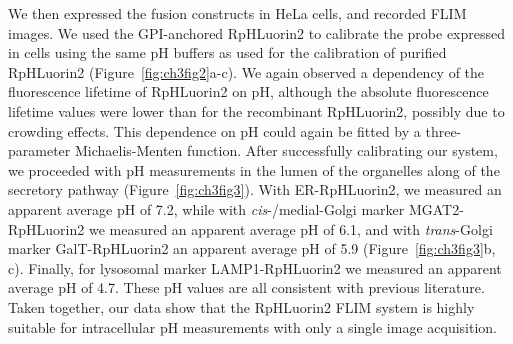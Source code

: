 We then expressed the fusion constructs in HeLa cells, and recorded FLIM images. We used the GPI-anchored RpHLuorin2 to calibrate the probe expressed in cells using the same pH buffers as used for the calibration of purified RpHLuorin2 (Figure~\ref{fig:ch3fig2}a-c). We again observed a dependency of the fluorescence lifetime of RpHLuorin2 on pH, although the absolute fluorescence lifetime values were lower than for the recombinant RpHLuorin2, possibly due to crowding effects. This dependence on pH could again be fitted by a three-parameter Michaelis-Menten function. After successfully calibrating our system, we proceeded with pH measurements in the lumen of the organelles along of the secretory pathway (Figure~\ref{fig:ch3fig3}). With ER-RpHLuorin2, we measured an apparent average pH of 7.2, while with \emph{cis}-/medial-Golgi marker MGAT2-RpHLuorin2 we measured an apparent average pH of 6.1, and with \emph{trans}-Golgi marker GalT-RpHLuorin2 an apparent average pH of 5.9 (Figure~\ref{fig:ch3fig3}b, c). Finally, for lysosomal marker LAMP1-RpHLuorin2 we measured an apparent average pH of 4.7. These pH values are all consistent with previous literature\cite{casey_sensors_2010,johnson_position_2016}. Taken together, our data show that the RpHLuorin2 FLIM system is highly suitable for intracellular pH measurements with only a single image acquisition.

